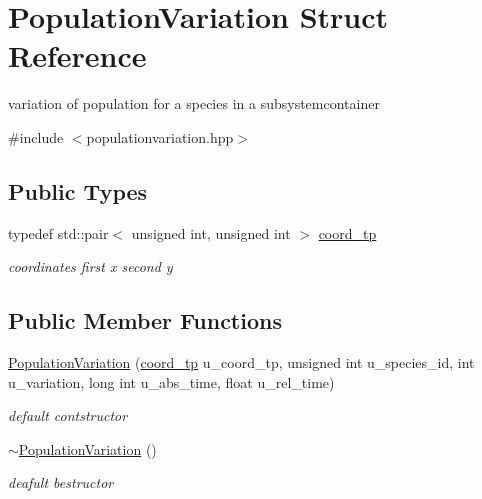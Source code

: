 \hypertarget{structPopulationVariation}{
\section{PopulationVariation Struct Reference}
\label{structPopulationVariation}
}


variation of population for a species in a subsystemcontainer  




{\ttfamily \#include $<$populationvariation.hpp$>$}

\subsection*{Public Types}
\begin{DoxyCompactItemize}
\item 
\hypertarget{structPopulationVariation_aae36f241d7c3048d87f581bce205fcd1}{
typedef std::pair$<$ unsigned int, unsigned int $>$ \hyperlink{structPopulationVariation_aae36f241d7c3048d87f581bce205fcd1}{coord\_\-tp}}
\label{structPopulationVariation_aae36f241d7c3048d87f581bce205fcd1}

\begin{DoxyCompactList}\small\item\em coordinates first x second y \end{DoxyCompactList}\end{DoxyCompactItemize}
\subsection*{Public Member Functions}
\begin{DoxyCompactItemize}
\item 
\hypertarget{structPopulationVariation_ae2c29030c2724faa35e1e423e9e4f6d3}{
\hyperlink{structPopulationVariation_ae2c29030c2724faa35e1e423e9e4f6d3}{PopulationVariation} (\hyperlink{structPopulationVariation_aae36f241d7c3048d87f581bce205fcd1}{coord\_\-tp} u\_\-coord\_\-tp, unsigned int u\_\-species\_\-id, int u\_\-variation, long int u\_\-abs\_\-time, float u\_\-rel\_\-time)}
\label{structPopulationVariation_ae2c29030c2724faa35e1e423e9e4f6d3}

\begin{DoxyCompactList}\small\item\em default contstructor \end{DoxyCompactList}\item 
\hypertarget{structPopulationVariation_a951e2ea39e8aa3024f514da0e79da185}{
\hyperlink{structPopulationVariation_a951e2ea39e8aa3024f514da0e79da185}{$\sim$PopulationVariation} ()}
\label{structPopulationVariation_a951e2ea39e8aa3024f514da0e79da185}

\begin{DoxyCompactList}\small\item\em deafult bestructor \end{DoxyCompactList}\end{DoxyCompactItemize}
